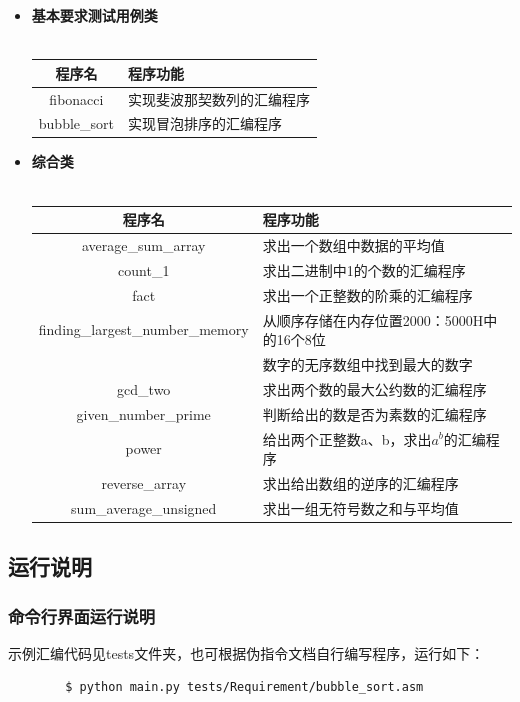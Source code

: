 \documentclass[UTF8,12pt]{article}
\begin{document}
\begin{itemize}
    	   \item \textbf{基本要求测试用例类} \\ \\
	            \begin{tabular}{c|l}
	                \hline
        	        程序名 & 程序功能 \\
        	        \hline
        	        fibonacci & 实现斐波那契数列的汇编程序 \\ \hline
        	        bubble\_sort & 实现冒泡排序的汇编程序 \\ \hline
    	        \end{tabular}
    	        
    	   \item \textbf{综合类} \\ \\
	            \begin{tabular}{c|l}
	                \hline
        	        程序名 & 程序功能 \\
        	        \hline
        	        average\_sum\_array & 求出一个数组中数据的平均值 \\ \hline
        	        count\_1 & 求出二进制中1的个数的汇编程序 \\ \hline
        	        fact & 求出一个正整数的阶乘的汇编程序 \\ \hline
        	        finding\_largest\_number\_memory & 从顺序存储在内存位置2000：5000H中的16个8位\\&数字的无序数组中找到最大的数字 \\ \hline
        	        gcd\_two & 求出两个数的最大公约数的汇编程序 \\ \hline
        	        given\_number\_prime & 判断给出的数是否为素数的汇编程序 \\ \hline
        	        power & 给出两个正整数a、b，求出$a^b$的汇编程序 \\ \hline
        	        reverse\_array & 求出给出数组的逆序的汇编程序 \\ \hline
        	        sum\_average\_unsigned & 求出一组无符号数之和与平均值 \\ \hline
    	        \end{tabular}
	    
	    \end{itemize}
	    \subsection{运行说明}
	    
	    \subsubsection{命令行界面运行说明}
	    示例汇编代码见tests文件夹，也可根据伪指令文档自行编写程序，运行如下：
	    \begin{lstlisting}
	    $ python main.py tests/Requirement/bubble_sort.asm
	    \end{lstlisting}
	    
\end{document}
